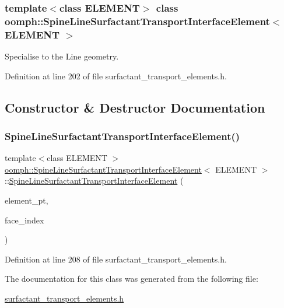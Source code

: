 \subsubsection*{template$<$class E\+L\+E\+M\+E\+NT$>$\newline
class oomph\+::\+Spine\+Line\+Surfactant\+Transport\+Interface\+Element$<$ E\+L\+E\+M\+E\+N\+T $>$}

Specialise to the Line geometry. 

Definition at line 202 of file surfactant\+\_\+transport\+\_\+elements.\+h.



\subsection{Constructor \& Destructor Documentation}
\mbox{\label{classoomph_1_1SpineLineSurfactantTransportInterfaceElement_a0b9ae72a734043e18ef9fc55629de3b6}} 
\subsubsection{\texorpdfstring{Spine\+Line\+Surfactant\+Transport\+Interface\+Element()}{SpineLineSurfactantTransportInterfaceElement()}}
{\footnotesize\ttfamily template$<$class E\+L\+E\+M\+E\+NT $>$ \\
\hyperlink{classoomph_1_1SpineLineSurfactantTransportInterfaceElement}{oomph\+::\+Spine\+Line\+Surfactant\+Transport\+Interface\+Element}$<$ E\+L\+E\+M\+E\+NT $>$\+::\hyperlink{classoomph_1_1SpineLineSurfactantTransportInterfaceElement}{Spine\+Line\+Surfactant\+Transport\+Interface\+Element} (\begin{DoxyParamCaption}\item[{\hyperlink{classoomph_1_1FiniteElement}{Finite\+Element} $\ast$const \&}]{element\+\_\+pt,  }\item[{const int \&}]{face\+\_\+index }\end{DoxyParamCaption})\hspace{0.3cm}{\ttfamily [inline]}}



Definition at line 208 of file surfactant\+\_\+transport\+\_\+elements.\+h.



The documentation for this class was generated from the following file\+:\begin{DoxyCompactItemize}
\item 
\hyperlink{surfactant__transport__elements_8h}{surfactant\+\_\+transport\+\_\+elements.\+h}\end{DoxyCompactItemize}
